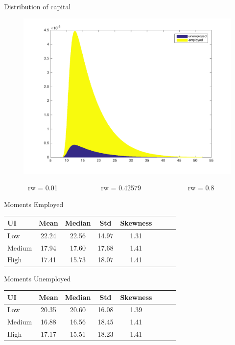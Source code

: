 \documentclass{beamer}
\begin{document}
\begin{frame}{Distribution of capital}
\begin{figure}[!tbp]
\begin{minipage}[b]{0.32\textwidth}
  \end{minipage}
  \hfill
  \begin{minipage}[b]{0.32\textwidth}
    \includegraphics[width=\textwidth]{distribution3}
  \end{minipage}
\end{figure}
\ \ \ \ \ \ \  rw = 0.01 \ \ \ \ \ \ \ \ \ \ \ \ rw = 0.42579 \ \ \ \ \ \ \ \ \ \ \ \ \ rw = 0.8
\end{frame}

\begin{frame}{Moments Employed}

\centering
\begin{tabular}{l*{6}{c}r}
UI             & Mean & Median & Std & Skewness\\
\hline
Low 			& 22.24 & 22.56 & 14.97 & 1.31\\
Medium         & 17.94 & 17.60 & 17.68 & 1.41\\
High          & 17.41 & 15.73 & 18.07 & 1.41 \\
\end{tabular}

		

\end{frame}

\begin{frame}{Moments Unemployed}

\centering	
\begin{tabular}{l*{6}{c}r}
UI             & Mean & Median & Std & Skewness\\
\hline
Low 			& 20.35 & 20.60 & 16.08 & 1.39\\
Medium         & 16.88 & 16.56 & 18.45 & 1.41\\
High          & 17.17 & 15.51 & 18.23 & 1.41 \\
\end{tabular}

		
\end{frame}
\end{document}
